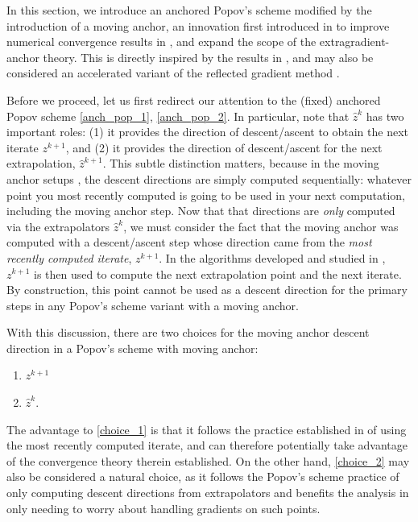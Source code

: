 \documentclass[11pt,reqno,oneside]{amsart}
\theoremstyle{definition}
\numberwithin{equation}{section}
\begin{document}
In this section, we introduce an anchored Popov's scheme modified by the introduction of a moving anchor, an innovation first introduced in \cite{alcala2023moving} to improve numerical convergence results in \cite{yoon_ryu}, \cite{lee2021fast} and expand the scope of the extragradient-anchor theory.
This is directly inspired by the results in \cite{tran2021halpern}, and may also be considered an accelerated variant of the reflected gradient method \cite{Malitsky_2015}.

Before we proceed, let us first redirect our attention to the (fixed) anchored Popov scheme \cref{anch_pop_1}, \cref{anch_pop_2}.
In particular, note that $\hat{z}^{k}$ has two important roles: (1) it provides the direction of descent/ascent to obtain the next iterate $z^{k+1}$, and (2) it provides the direction of descent/ascent for the next extrapolation, $\hat{z}^{k+1}$.
This subtle distinction matters, because in the moving anchor setups \cite{alcala2023moving}, the descent directions are simply computed sequentially: whatever point you most recently computed is going to be used in your next computation, including the moving anchor step.
Now that that directions are \textit{only} computed via the extrapolators $\hat{z}^{k}$, we must consider the fact that the moving anchor was computed with a descent/ascent step whose direction came from the \textit{most recently computed iterate}, $z^{k+1}$.
In the algorithms developed and studied in \cite{alcala2023moving}, $z^{k+1}$ is then used to compute the next extrapolation point and the next iterate.
By construction, this point cannot be used as a descent direction for the primary steps in any Popov's scheme variant with a moving anchor.

With this discussion, there are two choices for the moving anchor descent direction in a Popov's scheme with moving anchor:
\begin{enumerate}
    \item $z^{k+1}$ \label{choice_1}
    \item $\hat{z}^{k}$. \label{choice_2}
\end{enumerate}
The advantage to \cref{choice_1} is that it follows the practice established in \cite{alcala2023moving} of using the most recently computed iterate, and can therefore potentially take advantage of the convergence theory therein established. 
On the other hand, \cref{choice_2} may also be considered a natural choice, as it follows the Popov's scheme practice of only computing descent directions from extrapolators and benefits the analysis in only needing to worry about handling gradients on such points.
\end{document}
